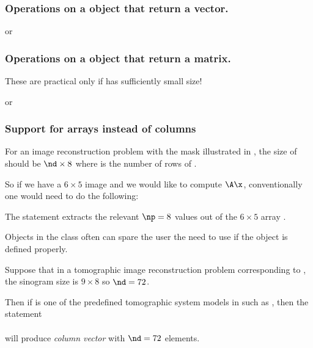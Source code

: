 \subsubsection
{
Operations on a \fatrixx object
that return a vector.
}

\blist
\item
{} or 
\elist


\subsubsection
{
Operations on a \fatrixx object
that return a matrix.
}

These are practical only if  has sufficiently small size!

\blist
\item
{} or 
\item
{}
\item
{}
\elist


\subsubsection
{
Support for arrays instead of columns
}

For an image reconstruction problem
with the mask illustrated in ,
the size of  should be
$\nd \times 8$
where \nd is the number of rows of \A.

So if we have a $6 \times 5$ image 
and we would like to compute
$\A \x$,
conventionally
one would need to do the following:
\\

The statement 
extracts the relevant $\np = 8$ values
out of the $6 \times 5$ array .

Objects in the \fatrixx class
often can spare the user the need to use 
if the object is defined properly.

Suppose that in a tomographic image reconstruction problem
corresponding to ,
the sinogram size is $9 \times 8$
so $\nd = 72$.

Then if  is one of the predefined tomographic system models
in \irt such as ,
then the statement
\\
\\
will produce \emph{column vector} 
with $\nd = 72$ elements.

